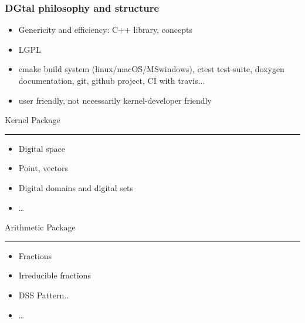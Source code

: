 \documentclass[8pt]{beamer}
\newcommand{\HH}{ \vspace{0.5pt}\hrule}
\begin{document}
\begin{frame}%
  \frametitle{DGtal philosophy and structure}

  \begin{block}{}
    \small
    \begin{itemize}
    \item  Genericity and efficiency: C++ library, concepts
    \item  LGPL
    \item cmake build system (linux/macOS/MSwindows), ctest
      test-suite, doxygen documentation, git, github project, CI with travis...
    \item user friendly, not necessarily kernel-developer friendly
    \end{itemize}
  \end{block} 
  \begin{alertblock}{\centering Kernel Package\HH}
            \small
          \begin{itemize}
          \item Digital space
          \item  Point, vectors
            \item Digital domains and digital sets
             \item  \ldots  
          \end{itemize}
       
   \end{alertblock}

 \begin{alertblock}{\centering Arithmetic Package\HH}
    \footnotesize
    \begin{itemize}
  \item  Fractions
  \item Irreducible fractions 
\item DSS Pattern..
    \item \ldots
    \end{itemize}
  \end{alertblock}

  
\end{frame}
\end{document}
